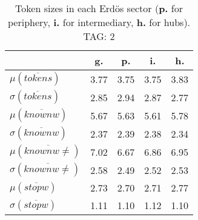 \begin{table}[h!]
\begin{center}
\begin{tabular}{| l || c | c | c | c |}\hline
 & {\bf g.} & {\bf p.} & {\bf i.} & {\bf h.} \\\hline\hline
$\mu(\overline{tokens})$ & 3.77  & 3.75  & 3.75  & 3.83 \\
$\sigma(\overline{tokens})$ & 2.85  & 2.94  & 2.87  & 2.77 \\\hline
$\mu(\overline{knownw})$ & 5.67  & 5.63  & 5.61  & 5.78 \\
$\sigma(\overline{knownw})$ & 2.37  & 2.39  & 2.38  & 2.34 \\\hline
$\mu(\overline{knownw \neq})$ & 7.02  & 6.67  & 6.86  & 6.95 \\
$\sigma(\overline{knownw \neq})$ & 2.58  & 2.49  & 2.52  & 2.53 \\\hline
$\mu(\overline{stopw})$ & 2.73  & 2.70  & 2.71  & 2.77 \\
$\sigma(\overline{stopw})$ & 1.11  & 1.10  & 1.12  & 1.10 \\\hline
\end{tabular}
\caption{Token sizes in each Erd\"os sector ({{\bf p.}} for periphery, {{\bf i.}} for intermediary, {{\bf h.}} for hubs). TAG: 2}
\end{center}
\end{table}